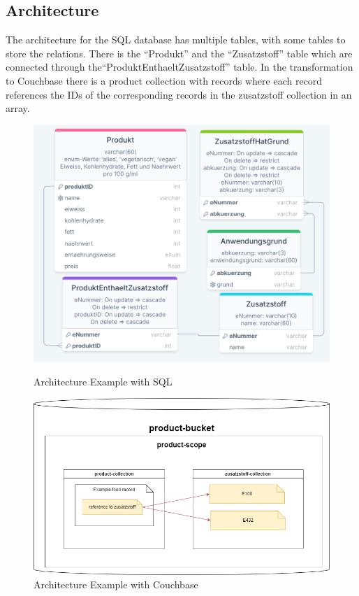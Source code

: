 \subsection{Architecture}
The architecture for the \ac{SQL} database has multiple tables, with some tables to store the relations. There is the ``Produkt'' and the ``Zusatzstoff'' table which are connected through the``ProduktEnthaeltZusatzstoff'' table. In the transformation to Couchbase there is a product collection with records where each record references the IDs of the corresponding records in the zusatzstoff collection in an array.
\begin{figure}[H]
    \centering
    \begin{minipage}{0.48\textwidth}
        \centering
        \includegraphics[width=1\textwidth]{images/Architecture_Example_SQL.png} %
        \caption{Architecture Example with \ac{SQL}}
    \end{minipage}\hfill
    \begin{minipage}{0.48\textwidth}
        \centering
        \includegraphics[width=1\textwidth]{images/Architecture_Example_Couchbase.png} %
        \caption{Architecture Example with Couchbase}
    \end{minipage}
\end{figure}

